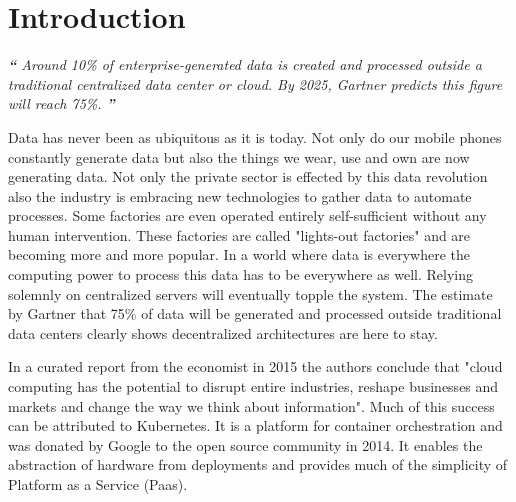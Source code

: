 \section{Introduction}
\begin{displayquote}
\textit{\textbf{\Huge{``}}
\large{Around 10\% of enterprise-generated data is created and processed outside a traditional centralized data center or cloud. By 2025, Gartner predicts this figure will reach 75\%.\cite{gartnerEdgeComputing:online}}
\textbf{\Huge{''}}}
\\[1pt]
\end{displayquote}
Data has never been as ubiquitous as it is today. Not only do our mobile phones constantly generate data but also the things we wear, use and own are now generating data. Not only the private sector is effected by this data revolution also the industry is embracing new technologies to gather data to automate processes. Some factories are even operated entirely self-sufficient without any human intervention. These factories are called "lights-out factories" and are becoming more and more popular\cite{wheresmyRobotLightsOut33:online}. In a world where data is everywhere the computing power to process this data has to be everywhere as well. Relying solemnly on centralized servers will eventually topple the system. The estimate by Gartner that 75\% of data will be generated and processed outside traditional data centers clearly shows decentralized architectures are here to stay.

In a curated report from the economist in 2015 the authors conclude that "cloud computing has the potential to disrupt entire industries, reshape businesses and markets and change the way we think about information"\cite{PuttogetEconomistCloud13:online}. Much of this success can be attributed to Kubernetes. It is a platform for container orchestration and was donated by Google to the open source community in 2014\cite{WhatisKubernetes87:online}. It enables the abstraction of hardware from deployments and provides much of the simplicity of Platform as a Service (Paas)\cite{WhatisKubernetes87:online}.

